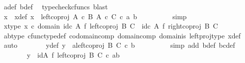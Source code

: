 \begin{isabellebody}
\ a{\isacharunderscore}{\kern0pt}def\ b{\isacharunderscore}{\kern0pt}def\ \isamarkupfalse%
\ {\isacharparenleft}{\kern0pt}typecheck{\isacharunderscore}{\kern0pt}cfuncs{\isacharcomma}{\kern0pt}\ blast{\isacharparenright}{\kern0pt}\isanewline
\ \ \ \ \ \ \isamarkupfalse%
\ x\ \ x{\isacharunderscore}{\kern0pt}def{\isacharcolon}{\kern0pt}\ {\isachardoublequoteopen}x\ {\isacharequal}{\kern0pt}\ left{\isacharunderscore}{\kern0pt}coproj\ {\isacharparenleft}{\kern0pt}A\ {\isasymtimes}\isactrlsub c\ B{\isacharparenright}{\kern0pt}\ {\isacharparenleft}{\kern0pt}A\ {\isasymtimes}\isactrlsub c\ C{\isacharparenright}{\kern0pt}\ {\isasymcirc}\isactrlsub c\ {\isasymlangle}a{\isacharcomma}{\kern0pt}\ b{\isasymrangle}{\isachardoublequoteclose}\isanewline
\ \ \ \ \ \ \ \ \isamarkupfalse%
\ simp\isanewline
\ \ \ \ \ \ \isamarkupfalse%
\ x{\isacharunderscore}{\kern0pt}type{\isacharcolon}{\kern0pt}\ {\isachardoublequoteopen}x\ {\isasymin}\isactrlsub c\ domain\ {\isacharparenleft}{\kern0pt}{\isacharparenleft}{\kern0pt}id\isactrlsub c\ A\ {\isasymtimes}\isactrlsub f\ left{\isacharunderscore}{\kern0pt}coproj\ B\ C{\isacharparenright}{\kern0pt}\ {\isasymamalg}\ {\isacharparenleft}{\kern0pt}id\isactrlsub c\ A\ {\isasymtimes}\isactrlsub f\ right{\isacharunderscore}{\kern0pt}coproj\ B\ C{\isacharparenright}{\kern0pt}{\isacharparenright}{\kern0pt}{\isachardoublequoteclose}\isanewline
\ \ \ \ \ \ \ \ \isamarkupfalse%
\ ab{\isacharunderscore}{\kern0pt}type\ cfunc{\isacharunderscore}{\kern0pt}type{\isacharunderscore}{\kern0pt}def\ codomain{\isacharunderscore}{\kern0pt}comp\ domain{\isacharunderscore}{\kern0pt}comp\ domain{\isacharunderscore}{\kern0pt}is\ left{\isacharunderscore}{\kern0pt}proj{\isacharunderscore}{\kern0pt}type\ x{\isacharunderscore}{\kern0pt}def\ \isamarkupfalse%
\ auto\isanewline
\ \ \ \ \ \ \isamarkupfalse%
\ y{\isacharunderscore}{\kern0pt}def{}{\isacharcolon}{\kern0pt}\ {\isachardoublequoteopen}y\ {\isacharequal}{\kern0pt}\ {\isasymlangle}a{\isacharcomma}{\kern0pt}left{\isacharunderscore}{\kern0pt}coproj\ B\ C\ {\isasymcirc}\isactrlsub c\ b{\isasymrangle}{\isachardoublequoteclose}\isanewline
\ \ \ \ \ \ \ \ \isamarkupfalse%
\ {\isacharparenleft}{\kern0pt}simp\ add{\isacharcolon}{\kern0pt}\ b{\isacharunderscore}{\kern0pt}def\ bc{\isacharunderscore}{\kern0pt}def{\isacharparenright}{\kern0pt}\isanewline
\ \ \ \ \ \ \isamarkupfalse%
\ {\isachardoublequoteopen}y\ {\isacharequal}{\kern0pt}\ {\isacharparenleft}{\kern0pt}id{\isacharparenleft}{\kern0pt}A{\isacharparenright}{\kern0pt}\ {\isasymtimes}\isactrlsub f\ left{\isacharunderscore}{\kern0pt}coproj\ B\ C{\isacharparenright}{\kern0pt}\ {\isasymcirc}\isactrlsub c\ {\isasymlangle}a{\isacharcomma}{\kern0pt}b{\isasymrangle}{\isachardoublequoteclose}\isanewline

\end{isabellebody}
